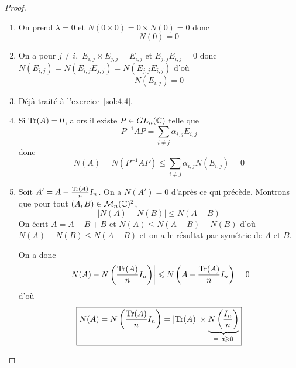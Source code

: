 \begin{proof}
    \phantom{}
    \begin{enumerate}
        \item On prend $\lambda=0$ et $N(0\times 0)=0\times N(0)=0$ donc 
        \begin{equation}
            \boxed{N(0)=0}
        \end{equation}

        \item On a pour $j\neq i,$ $E_{i,j}\times E_{j,j}=E_{i,j}$ et $E_{j,j}E_{i,j}=0$ donc $N(E_{i,j})=N(E_{i,j}E_{j,j})=N(E_{j,j}E_{i,j})$ d'où 
        \begin{equation}
            \boxed{N(E_{i,j})=0}
        \end{equation}

        \item Déjà traité à l'exercice~\ref{sol:4.4}.
        
        \item Si $\operatorname{Tr}(A)=0$, alors il existe $P\in GL_{n}(\mathbb{C})$ telle que 
        \begin{equation}
            P^{-1}AP=\sum_{i\neq j}\alpha_{i,j}E_{i,j}
        \end{equation}
        donc 
        \begin{equation}
            \boxed{N(A)=N(P^{-1}AP)\leqslant\sum_{i\neq j}\alpha_{i,j}N(E_{i,j})=0}
        \end{equation}

        \item Soit $A'=A-\frac{\operatorname{Tr}(A)}{n}I_{n}$. On a $N(A')=0$ d'après ce qui précède. Montrons que pour tout $(A,B)\in\mathcal{M}_{n}(\mathbb{C})^{2}$,
        \begin{equation}
            \left\lvert N(A)-N(B)\right\rvert\leqslant N(A-B)
        \end{equation}
        On écrit $A=A-B+B$ et $N(A)\leqslant N(A-B)+N(B)$ d'où $N(A)-N(B)\leqslant N(A-B)$ et on a le résultat par symétrie de $A$ et $B$.

        On a donc 
        \begin{equation}
            \left\lvert N(A)-N\left(\frac{\operatorname{Tr}(A)}{n}I_{n}\right)\right\rvert\leqslant N\left(A-\frac{\operatorname{Tr}(A)}{n}I_{n}\right)=0
        \end{equation}
        d'où 
        \begin{equation}
            \boxed{N(A)=N\left(\frac{\operatorname{Tr}(A)}{n}I_{n}\right)=\left\lvert\operatorname{Tr}(A)\right\rvert\times \underbrace{N\left(\frac{I_{n}}{n}\right)}_{=~a\geqslant0}}
        \end{equation}
    \end{enumerate}
\end{proof}

